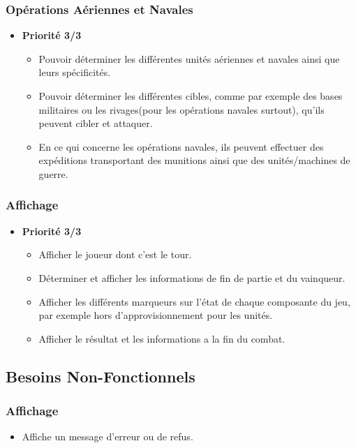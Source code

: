 \documentclass{article}[a4paper, 12pt]
\begin{document}
\subsubsection{Opérations Aériennes et Navales}
\begin{itemize}
    \item \textbf{Priorité 3/3}
    \begin{itemize}
        \item Pouvoir déterminer les différentes unités aériennes et navales ainsi que leurs spécificités.
        \item Pouvoir déterminer les différentes cibles, comme par exemple des bases militaires ou les rivages(pour les opérations navales surtout), qu'ils peuvent cibler et attaquer.
        \item En ce qui concerne les opérations navales, ils peuvent effectuer des expéditions transportant des munitions ainsi que des unités/machines de guerre.
    \end{itemize}
\end{itemize}

\subsubsection{Affichage}
\begin{itemize}
    \item \textbf{Priorité 3/3}
    \begin{itemize}
        \item Afficher le joueur dont c'est le tour.
        \item Déterminer et afficher les informations de fin de partie et du vainqueur.
        \item Afficher les différents marqueurs sur l'état de chaque composante du jeu, par exemple hors d'approvisionnement pour les unités.
        \item Afficher le résultat et les informations a la fin du combat.
    \end{itemize}
\end{itemize}

\subsection{Besoins Non-Fonctionnels}

\subsubsection{Affichage}
\begin{itemize}
    \item Affiche un message d'erreur ou de refus.
\end{itemize}
\end{document}
